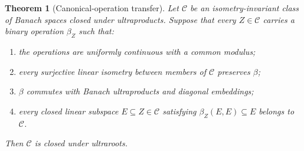 \documentclass[11pt]{article}
\newcommand{\C}{\mathcal C}
\newcommand{\1}{\mathbf 1}
\newtheorem{theorem}{Theorem}[section]
\theoremstyle{definition}
\theoremstyle{remark}
\begin{document}
\begin{theorem}[Canonical-operation transfer]
\label{thm:transfer}
Let $\C$ be an isometry-invariant class of Banach spaces closed under
ultraproducts.  Suppose that every $Z\in\C$ carries a binary operation
$\beta_Z$ such that:
\begin{enumerate}[label=\textup{(\alph*)}]
\item the operations are uniformly continuous with a common modulus;
\item every surjective linear isometry between members of $\C$ preserves
      $\beta$;
\item $\beta$ commutes with Banach ultraproducts and diagonal embeddings;
\item every closed linear subspace $E\subseteq Z\in\C$ satisfying
      $\beta_Z(E,E)\subseteq E$ belongs to $\C$.
\end{enumerate}
Then $\C$ is closed under ultraroots.
\end{theorem}
\end{document}

